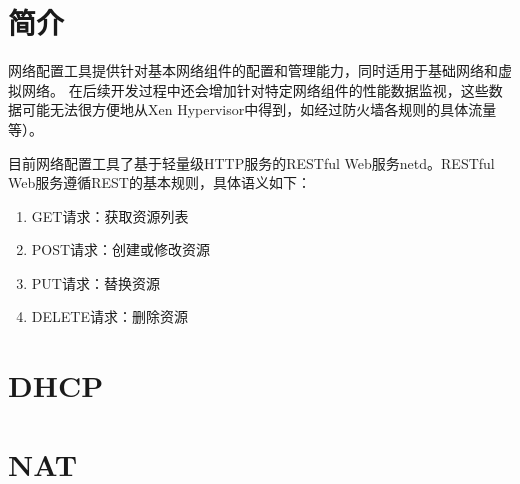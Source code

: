 \section{简介}
网络配置工具提供针对基本网络组件的配置和管理能力，同时适用于基础网络和虚拟网络。
在后续开发过程中还会增加针对特定网络组件的性能数据监视，这些数据可能无法很方便地从Xen Hypervisor中得到，如经过防火墙各规则的具体流量等）。

目前网络配置工具了基于轻量级HTTP服务的RESTful Web服务netd。RESTful Web服务遵循REST的基本规则，具体语义如下：
\begin{enumerate}
\item GET请求：获取资源列表
\item POST请求：创建或修改资源
\item PUT请求：替换资源
\item DELETE请求：删除资源
\end{enumerate}

\section{DHCP}

\section{NAT}

